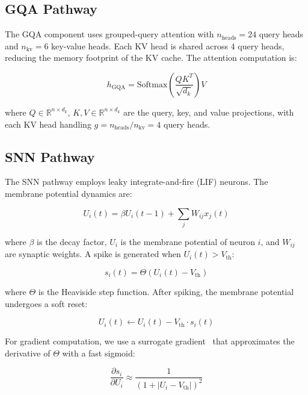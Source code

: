 \documentclass[conference]{IEEEtran}
\begin{document}
\subsection{GQA Pathway}

The GQA component uses grouped-query attention with $n_{\text{heads}}=24$ query heads and $n_{\text{kv}}=6$ key-value heads. Each KV head is shared across 4 query heads, reducing the memory footprint of the KV cache. The attention computation is:

\begin{equation}
h_{\text{GQA}} = \text{Softmax}\left(\frac{Q K^T}{\sqrt{d_k}}\right) V
\end{equation}

where $Q \in \mathbb{R}^{n \times d_k}$, $K, V \in \mathbb{R}^{n \times d_k}$ are the query, key, and value projections, with each KV head handling $g = n_{\text{heads}} / n_{\text{kv}} = 4$ query heads.

\subsection{SNN Pathway}

The SNN pathway employs leaky integrate-and-fire (LIF) neurons. The membrane potential dynamics are:

\begin{equation}
U_i(t) = \beta U_i(t-1) + \sum_j W_{ij} x_j(t)
\end{equation}

where $\beta$ is the decay factor, $U_i$ is the membrane potential of neuron $i$, and $W_{ij}$ are synaptic weights. A spike is generated when $U_i(t) > V_{\text{th}}$:

\begin{equation}
s_i(t) = \Theta(U_i(t) - V_{\text{th}})
\end{equation}

where $\Theta$ is the Heaviside step function. After spiking, the membrane potential undergoes a soft reset:

\begin{equation}
U_i(t) \leftarrow U_i(t) - V_{\text{th}} \cdot s_i(t)
\end{equation}

For gradient computation, we use a surrogate gradient~\cite{neftci2019surrogate} that approximates the derivative of $\Theta$ with a fast sigmoid:

\begin{equation}
\frac{\partial s_i}{\partial U_i} \approx \frac{1}{(1 + |U_i - V_{\text{th}}|)^2}
\end{equation}
\end{document}
